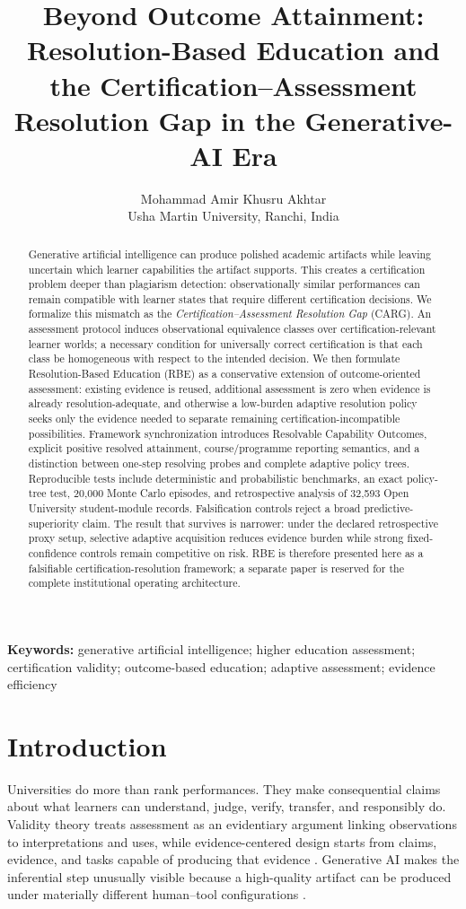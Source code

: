 \documentclass[11pt]{article}
\title{\textbf{Beyond Outcome Attainment: Resolution-Based Education and the Certification--Assessment Resolution Gap in the Generative-AI Era}}
\author{Mohammad Amir Khusru Akhtar\\Usha Martin University, Ranchi, India}
\date{}
\begin{document}
\maketitle
\begin{abstract}
Generative artificial intelligence can produce polished academic artifacts while leaving uncertain which learner capabilities the artifact supports. This creates a certification problem deeper than plagiarism detection: observationally similar performances can remain compatible with learner states that require different certification decisions. We formalize this mismatch as the \emph{Certification--Assessment Resolution Gap} (CARG). An assessment protocol induces observational equivalence classes over certification-relevant learner worlds; a necessary condition for universally correct certification is that each class be homogeneous with respect to the intended decision. We then formulate Resolution-Based Education (RBE) as a conservative extension of outcome-oriented assessment: existing evidence is reused, additional assessment is zero when evidence is already resolution-adequate, and otherwise a low-burden adaptive resolution policy seeks only the evidence needed to separate remaining certification-incompatible possibilities. Framework synchronization introduces Resolvable Capability Outcomes, explicit positive resolved attainment, course/programme reporting semantics, and a distinction between one-step resolving probes and complete adaptive policy trees. Reproducible tests include deterministic and probabilistic benchmarks, an exact policy-tree test, 20,000 Monte Carlo episodes, and retrospective analysis of 32,593 Open University student-module records. Falsification controls reject a broad predictive-superiority claim. The result that survives is narrower: under the declared retrospective proxy setup, selective adaptive acquisition reduces evidence burden while strong fixed-confidence controls remain competitive on risk. RBE is therefore presented here as a falsifiable certification-resolution framework; a separate paper is reserved for the complete institutional operating architecture.
\end{abstract}
\noindent\textbf{Keywords:} generative artificial intelligence; higher education assessment; certification validity; outcome-based education; adaptive assessment; evidence efficiency

\section{Introduction}
Universities do more than rank performances. They make consequential claims about what learners can understand, judge, verify, transfer, and responsibly do. Validity theory treats assessment as an evidentiary argument linking observations to interpretations and uses, while evidence-centered design starts from claims, evidence, and tasks capable of producing that evidence \parencite{messick1995validity,mislevy2003ecd}. Generative AI makes the inferential step unusually visible because a high-quality artifact can be produced under materially different human--tool configurations \parencite{luo2024policies,xia2024scoping,bearman2024evaluative,nikolic2023engineering}.
\end{document}
